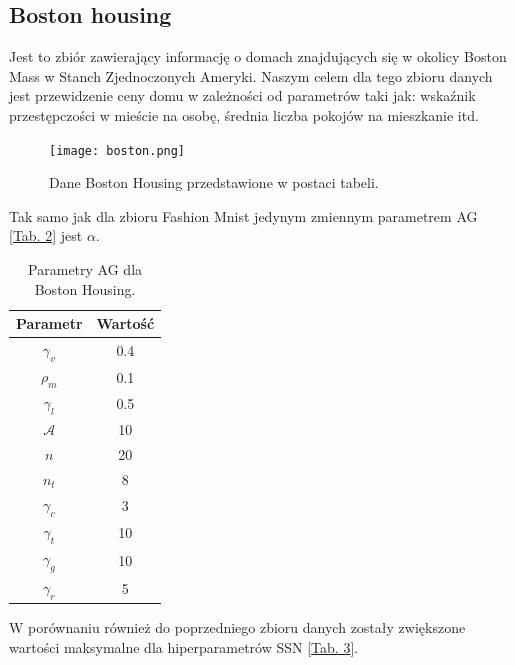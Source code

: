 \documentclass{article}
\begin{document}
\subsection{Boston housing}
Jest to zbiór zawierający informację o domach znajdujących się w okolicy Boston Mass w Stanch
Zjednoczonych Ameryki. Naszym celem dla tego zbioru danych jest przewidzenie ceny
domu w zależności od parametrów taki jak: wskaźnik przestępczości w mieście na osobę, 
średnia liczba pokojów na mieszkanie itd.

\begin{figure}[H]
\centering
\texttt{[image: boston.png]}
\caption{Dane Boston Housing przedstawione w postaci tabeli.}
\end{figure}

Tak samo jak dla zbioru Fashion Mnist jedynym zmiennym parametrem AG 
[\hyperref[tab:params]{Tab. 2}] jest $\alpha$.
\begin{table}[H]
\centering
\begin{tabular}{|c|c|}
	\hline
	Parametr & Wartość\\
	\hline
	 $\gamma_v$ &0.4\\
	 $\rho_m$ &0.1\\
	 $\gamma_l$& 0.5\\
	 $\mathcal{A}$ &10\\
	 $n$  &20\\
	 $n_t$  &8\\
	 $\gamma_c$  &3\\
	 $\gamma_t$ &10\\
	 $\gamma_g$ &10\\
	 $\gamma_r$ &5\\
	\hline
\end{tabular}
\caption{\label{tab:bh_params}Parametry AG dla Boston Housing.}
\end{table}
W porównaniu również do poprzedniego zbioru danych zostały zwiększone wartości
maksymalne dla hiperparametrów SSN [\hyperref[tab:zakres]{Tab. 3}].
\end{document}
